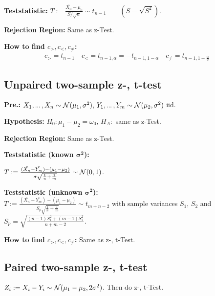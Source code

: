 \textbf{Teststatistic:} \(T := \frac{\bar{X_n} - \mu_0}{S / \sqrt{n}} \sim t_{n-1} \qquad (S = \sqrt{S^2})\).

\textbf{Rejection Region:} Same as z-Test.

\textbf{How to find \(c_>, c_<, c_{\neq}\):}
\begin{align*}
  c_> = t_{n-1} \quad c_< = t_{n-1, \alpha} = -t_{n-1, 1-\alpha} \quad c_{\neq} = t_{n-1, 1 - \frac{\alpha}{2}}
\end{align*}

\subsection{Unpaired two-sample z-, t-test}
\textbf{Pre.:} \(X_1, \sdots, X_{n} \sim \Normal(\mu_1, \sigma^2), \, Y_1, \sdots, Y_{m} \sim \Normal(\mu_2, \sigma^2)\) iid.

\textbf{Hypothesis:} \(H_0: \mu_1 - \mu_2 = \omega_0\), \(H_A:\) same as z-Test.

\textbf{Rejection Region:} Same as z-Test.

\textbf{Teststatistic (known \(\bm{\sigma^2}\)):}
\begin{center}
  \(T := \frac{(\bar{X_{n}} - \bar{Y_{m}}) - (\mu_1 - \mu_2)}{\sigma\sqrt{\frac{1}{n} + \frac{1}{m}}} \sim \operatorname{\mathcal{N}}(0, 1)\).
\end{center}

\textbf{Teststatistic (unknown \(\bm{\sigma^2}\)):} \\
\(T := \frac{(\bar{X_{n}} - \bar{Y_{m}}) - (\mu_1 - \mu_2)}{S_p\sqrt{\frac{1}{n} + \frac{1}{m}}} \sim t_{m + n - 2}\) with sample variances \(S_1\), \(S_2\) and 
\(S_p = \sqrt{\frac{(n - 1)S_1^2 + (m - 1)S_2^2}{n + m - 2}}\).

\textbf{How to find \(c_>, c_<, c_{\neq}\):} Same as z-, t-Test.

\subsection{Paired two-sample z-, t-test}
\(Z_i := X_i - Y_i \sim \operatorname{\mathcal{N}}(\mu_1 - \mu_2, 2\sigma^2)\). Then do z-, t-Test.
